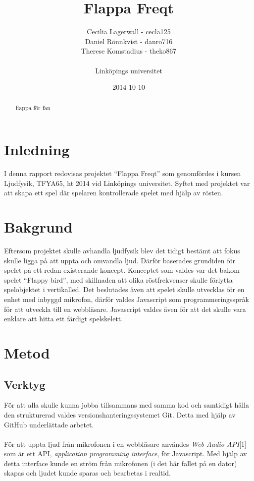\documentclass[12pt, titlepage, twoside, a4paper]{article}
\begin{document}
	\title{Flappa Freqt}
	\author{Cecilia Lagerwall - cecla125 \\ Daniel Rönnkvist - danro716 \\ 
			Therese Komstadius - theko867 \\ \\ Linköpings universitet}
	\date{2014-10-10}
	\maketitle
	\begin{abstract}
		flappa för fan
	\end{abstract}
	\section{Inledning}
		I denna rapport redovisas projektet “Flappa Freqt” som genomfördes i kursen Ljudfysik, TFYA65, ht 2014 vid Linköpings universitet. Syftet med projektet var att skapa ett spel där spelaren kontrollerade spelet med hjälp av rösten.
	\section{Bakgrund}
		Eftersom projektet skulle avhandla ljudfysik blev det tidigt bestämt att fokus skulle ligga på att uppta och omvandla ljud. Därför baserades grundiden för spelet på ett redan existerande koncept. Konceptet som valdes var det bakom spelet “Flappy bird”, med skillnaden att olika röstfrekvenser skulle förlytta spelobjektet i vertikalled. Det beslutades även att spelet skulle utvecklas för en enhet med inbyggd mikrofon, därför valdes Javascript som programmeringsspråk för att utveckla till en webbläsare. Javascript valdes även för att det skulle vara enklare att hitta ett färdigt spelskelett.
	\section{Metod}
		\subsection{Verktyg}
			För att alla skulle kunna jobba tillsammans med samma kod och samtidigt hålla den strukturerad valdes versionshanteringssystemet Git. Detta med hjälp av GitHub underlättade arbetet.
			\\ \\
			För att uppta ljud från mikrofonen i en webbläsare användes \textit{Web Audio API}[1] som är ett API, \textit{application programming interface}, för Javascript. Med hjälp av detta interface kunde en ström från mikrofonen (i det här fallet på en dator) skapas och ljudet kunde sparas och bearbetas i realtid.
\end{document}

